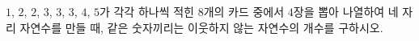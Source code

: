 $1$, $2$, $2$, $3$, $3$, $3$, $4$, $5$가 각각 하나씩 적힌 $8$개의 카드 중에서 $4$장을 뽑아 나열하여 네 자리 자연수를 만들 때, 같은 숫자끼리는 이웃하지 않는 자연수의 개수를 구하시오.

